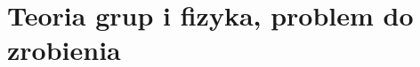 \documentclass[a4paper,11pt]{article}
\begin{document}
\begin{enumerate}












































\end{enumerate}










\section{Teoria grup i fizyka, problem do zrobienia}


\end{document}
